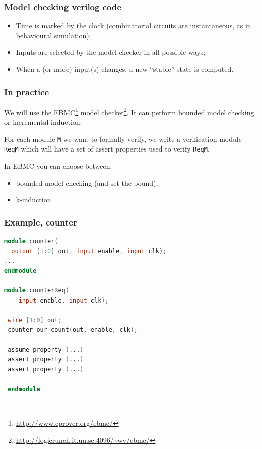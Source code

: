 \documentclass[usenames,dvipsnames]{beamer}
\begin{document}
\begin{frame}
  \frametitle{Model checking verilog code}
  
  \begin{itemize}
  \item Time is marked by the clock (combinatorial circuits are instantaneous, as in behavioural simulation);
  \item Inputs are selected by the model checker in all possible ways;
  \item When a (or more) input(s) changes, a new ``stable'' state is computed.
\end{itemize}

  
\end{frame}



\begin{frame}
  \frametitle{In practice}
  
  \begin{ntblock}
  	We will use the EBMC\footnote{\url{http://www.cprover.org/ebmc/}} model checker\footnote{\url{http://logicrunch.it.uu.se:4096/~wv/ebmc/}}. It can perform bounded model checking or incremental induction.
  \end{ntblock}

\vfill \pause

  For each module \texttt{M} we want to formally verify, we write a verification module \texttt{ReqM} which will have a set of assert properties used to verify \texttt{ReqM}.
  
  \vfill
  
In EBMC you can choose between:
\begin{itemize}
  \item bounded model checking (and set the bound);
  \item k-induction.
\end{itemize}
  
\end{frame}


\begin{frame}[fragile]
  \frametitle{Example, counter}
  
    \begin{lstlisting}[language=Verilog]
module counter(
  output [1:0] out, input enable, input clk);
...
endmodule

module counterReq(
	input enable, input clk);

 wire [1:0] out;
 counter our_count(out, enable, clk);
 
 assume property (...)
 assert property (...)
 assert property (...)  
 
 endmodule
 
 \end{lstlisting}
  
\end{frame}
\end{document}
